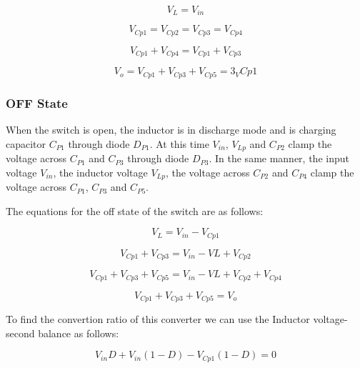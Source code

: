 \begin{equation}
	V_L = V_{in} 
	\label{eq:ML_ON1}
\end{equation} 

\begin{equation}
	V_{Cp1} = V_{Cp2} = V_{Cp3} = V_{Cp4}
	\label{eq:ML_ON1}
\end{equation} 

\begin{equation}
	V_{Cp1} + V_{Cp4} = V_{Cp1} + V_{Cp3}
	\label{eq:ML_ON1}
\end{equation} 

\begin{equation}
	V_o = V_{Cp1} + V_{Cp3} + V_{Cp5} = 3_V{Cp1}
	\label{eq:ML_ON1}
\end{equation}

\subsubsection{OFF State}
When the switch is open, the inductor is in discharge mode and is charging capacitor $C_{P1}$ through diode $D_{P1}$. At this time $V_{in}$, $V_{Lp}$ and $C_{P2}$ clamp the voltage across $C_{P1}$ and $C_{P3}$ through diode $D_{P3}$. In the same manner, the input voltage $V_{in}$, the inductor voltage $V_{Lp}$, the voltage across $C_{P2}$ and $C_{P4}$ clamp the voltage across $C_{P1}$, $C_{P3}$ and $C_{P5}$.

The equations for the off state of the switch are as follows:

\begin{equation}
	V_L = V_{in} - V_{Cp1}
	\label{eq:ML_ON1}
\end{equation}

\begin{equation}
	V_{Cp1} + V_{Cp3} = V_{in} - V{L} + V_{Cp2}
	\label{eq:ML_ON1}
\end{equation}
 
\begin{equation}
	V_{Cp1} + V_{Cp3} + V_{Cp5} = V_{in} - V{L} + V_{Cp2} + V_{Cp4}
	\label{eq:ML_ON1}
\end{equation}

\begin{equation}
	V_{Cp1} + V_{Cp3} + V_{Cp5} = V_o
	\label{eq:ML_ON1}
\end{equation}

To find the convertion ratio of this converter we can use the Inductor voltage-second balance as follows:

\begin{equation}
	V_{in}D + V_{in}(1-D) - V_{Cp1}(1-D)= 0
	\label{eq:ML_ON1}
\end{equation}